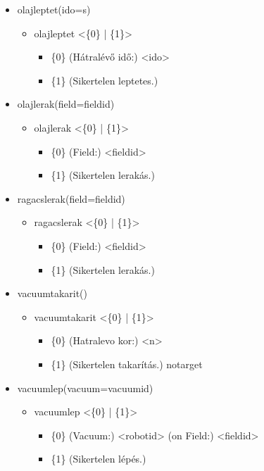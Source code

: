 \begin{itemize}
	\item olajleptet(ido=s)
	\begin{itemize}
		\item olajleptet  <\{0\} | \{1\}>
		\begin{itemize}
			\item \{0\} (Hátralévő idő:) <ido> 
			\item \{1\} (Sikertelen leptetes.)
		\end{itemize}
	\end{itemize}	
	
	\item olajlerak(field=fieldid)
	\begin{itemize}
		\item olajlerak  <\{0\} | \{1\}>
		\begin{itemize}
			\item \{0\} (Field:) <fieldid> 
			\item \{1\} (Sikertelen lerakás.)
		\end{itemize}
	\end{itemize}	
	
	\item ragacslerak(field=fieldid) 
	\begin{itemize}
		\item ragacslerak  <\{0\} | \{1\}>
		\begin{itemize}
			\item \{0\} (Field:) <fieldid> 
			\item \{1\} (Sikertelen lerakás.)
		\end{itemize}
	\end{itemize}		
	
	\item vacuumtakarit()
	\begin{itemize}
		\item vacuumtakarit  <\{0\} | \{1\}>
		\begin{itemize}
			\item \{0\} (Hatralevo kor:) <n>
			\item \{1\} (Sikertelen takarítás.) notarget
		\end{itemize}
	\end{itemize}
	
	\item vacuumlep(vacuum=vacuumid)
	\begin{itemize}
		\item vacuumlep  <\{0\} | \{1\}>
		\begin{itemize}
			\item \{0\} (Vacuum:) <robotid> (on Field:) <fieldid> 
			\item \{1\} (Sikertelen lépés.)
		\end{itemize}
	\end{itemize}	
	

\end{itemize}
